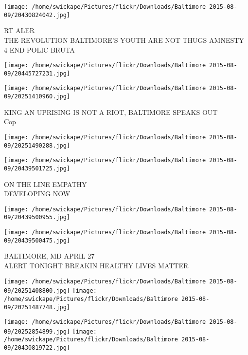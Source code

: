 \documentclass[10pt,letterpaper]{article}
\begin{document}
\vspace{0.25in}
\texttt{[image: /home/swickape/Pictures/flickr/Downloads/Baltimore 2015-08-09/20430824042.jpg]}

RT ALER\\
THE REVOLUTION BALTIMORE'S YOUTH ARE NOT THUGS AMNESTY 4 END POLIC BRUTA\\
\pagebreak

\texttt{[image: /home/swickape/Pictures/flickr/Downloads/Baltimore 2015-08-09/20445727231.jpg]}

\vspace{0.25in}
\texttt{[image: /home/swickape/Pictures/flickr/Downloads/Baltimore 2015-08-09/20251410960.jpg]}

KING AN UPRISING IS NOT A RIOT, BALTIMORE SPEAKS OUT\\
Cop\\
\pagebreak

\texttt{[image: /home/swickape/Pictures/flickr/Downloads/Baltimore 2015-08-09/20251490288.jpg]}

\vspace{0.25in}
\texttt{[image: /home/swickape/Pictures/flickr/Downloads/Baltimore 2015-08-09/20439501725.jpg]}

ON THE LINE EMPATHY\\
DEVELOPING NOW\\
\pagebreak

\texttt{[image: /home/swickape/Pictures/flickr/Downloads/Baltimore 2015-08-09/20439500955.jpg]}

\vspace{0.25in}
\texttt{[image: /home/swickape/Pictures/flickr/Downloads/Baltimore 2015-08-09/20439500475.jpg]}

BALTIMORE, MD APRIL 27\\
ALERT TONIGHT BREAKIN HEALTHY LIVES MATTER\\
\pagebreak

\texttt{[image: /home/swickape/Pictures/flickr/Downloads/Baltimore 2015-08-09/20251408800.jpg]}
\texttt{[image: /home/swickape/Pictures/flickr/Downloads/Baltimore 2015-08-09/20251487748.jpg]}

\texttt{[image: /home/swickape/Pictures/flickr/Downloads/Baltimore 2015-08-09/20252854899.jpg]}
\texttt{[image: /home/swickape/Pictures/flickr/Downloads/Baltimore 2015-08-09/20430819722.jpg]}
\end{document}
